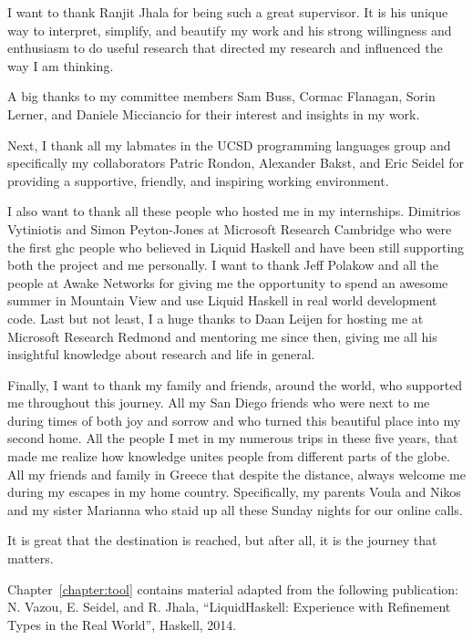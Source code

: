 I want to thank Ranjit Jhala for being such a great supervisor. 
%
It is his unique way to interpret, simplify, and beautify my 
work
and his strong willingness and enthusiasm to do useful research 
that directed my research and influenced the way I am thinking. 

A big thanks to my committee members 
Sam Buss, 
Cormac Flanagan,
Sorin Lerner, 
and Daniele Micciancio for their interest and insights in my work. 

Next, I thank all my labmates in the UCSD programming languages group and specifically my 
collaborators
Patric Rondon,
Alexander Bakst, and
Eric Seidel 
for providing a supportive, friendly, and inspiring working environment.

I also want to thank all these people who hosted me in my internships. 
%
%
Dimitrios Vytiniotis and Simon Peyton-Jones
at Microsoft Research Cambridge
who were the first ghc people who believed in Liquid Haskell
and have been still supporting both the project and me personally.
%
I want to thank Jeff Polakow and all the people at Awake Networks 
for giving me the opportunity to spend an awesome summer in Mountain View 
and use Liquid Haskell in real world development code. 
%
Last but not least, 
I a huge thanks to Daan Leijen 
for hosting me at Microsoft Research Redmond 
and mentoring me since then, giving me all his insightful
knowledge about research and life in general.

Finally, I want to thank my family and friends, around the world,
who supported me throughout this journey.
%
All my San Diego friends who were next to me 
during times of both joy and sorrow and 
who turned this beautiful place into 
my second home.
%
All the people I met in my numerous trips in these five years, 
that made me realize how knowledge unites people from different parts of the globe.
%
All my friends and family in Greece that despite the distance, 
always welcome me during my escapes in my home country. 
%
Specifically, my parents Voula and Nikos and my sister Marianna
who staid up all these Sunday nights for our online calls. 

It is great that the destination is reached, 
but after all, it is the journey that matters. 

\newpage

Chapter~\ref{chapter:tool} contains material adapted from the following publication:
\noindent N. Vazou, E. Seidel, and R. Jhala,
``LiquidHaskell: Experience with Refinement Types in the Real World'', 
Haskell, 2014.

